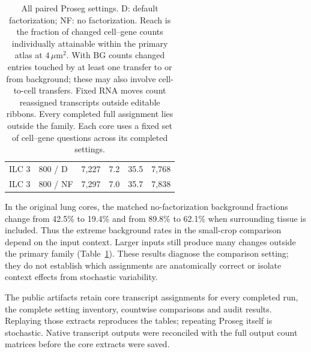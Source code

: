\begin{table}[ht]
\begin{tabular}{llrrrr}
ILC 3&800 / D&7,227&7.2&35.5&7,768\\
ILC 3&800 / NF&7,297&7.0&35.7&7,838\\
\bottomrule\end{tabular}
\caption{All paired Proseg settings. D: default factorization; NF: no factorization. Reach is the fraction of changed cell--gene counts individually attainable within the primary atlas at $4\,\mu\mathrm m^2$. With BG counts changed entries touched by at least one transfer to or from background; these may also involve cell-to-cell transfers. Fixed RNA moves count reassigned transcripts outside editable ribbons. Every completed full assignment lies outside the family. Each core uses a fixed set of cell--gene questions across its completed settings.}\label{tab:context-reach}
\end{table}
\FloatBarrier
In the original lung cores, the matched no-factorization background fractions change from 42.5\% to 19.4\% and from 89.8\% to 62.1\% when surrounding tissue is included. Thus the extreme background rates in the small-crop comparison depend on the input context. Larger inputs still produce many changes outside the primary family (Table~\ref{tab:context-reach}). These results diagnose the comparison setting; they do not establish which assignments are anatomically correct or isolate context effects from stochastic variability.

The public artifacts retain core transcript assignments for every completed run, the complete setting inventory, countwise comparisons and audit results. Replaying those extracts reproduces the tables; repeating Proseg itself is stochastic. Native transcript outputs were reconciled with the full output count matrices before the core extracts were saved.
